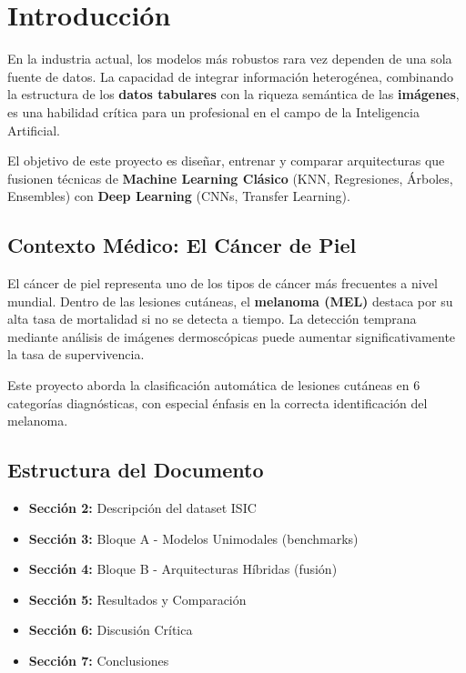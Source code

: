 \documentclass[12pt,a4paper]{article}
\begin{document}
\section{Introducción}

En la industria actual, los modelos más robustos rara vez dependen de una sola fuente de datos. La capacidad de integrar información heterogénea, combinando la estructura de los \textbf{datos tabulares} con la riqueza semántica de las \textbf{imágenes}, es una habilidad crítica para un profesional en el campo de la Inteligencia Artificial.

El objetivo de este proyecto es diseñar, entrenar y comparar arquitecturas que fusionen técnicas de \textbf{Machine Learning Clásico} (KNN, Regresiones, Árboles, Ensembles) con \textbf{Deep Learning} (CNNs, Transfer Learning).

\subsection{Contexto Médico: El Cáncer de Piel}

El cáncer de piel representa uno de los tipos de cáncer más frecuentes a nivel mundial. Dentro de las lesiones cutáneas, el \textbf{melanoma (MEL)} destaca por su alta tasa de mortalidad si no se detecta a tiempo. La detección temprana mediante análisis de imágenes dermoscópicas puede aumentar significativamente la tasa de supervivencia.

Este proyecto aborda la clasificación automática de lesiones cutáneas en 6 categorías diagnósticas, con especial énfasis en la correcta identificación del melanoma.

\subsection{Estructura del Documento}

\begin{itemize}
    \item \textbf{Sección 2:} Descripción del dataset ISIC
    \item \textbf{Sección 3:} Bloque A - Modelos Unimodales (benchmarks)
    \item \textbf{Sección 4:} Bloque B - Arquitecturas Híbridas (fusión)
    \item \textbf{Sección 5:} Resultados y Comparación
    \item \textbf{Sección 6:} Discusión Crítica
    \item \textbf{Sección 7:} Conclusiones
\end{itemize}
\end{document}
